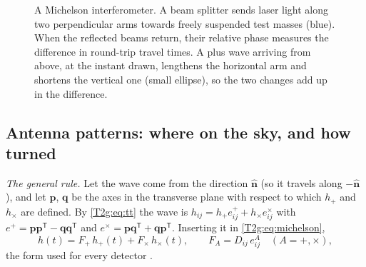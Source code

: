 \begin{figure}[htbp]
\centering
{}
\caption{A Michelson interferometer. A beam splitter sends laser light along two perpendicular arms towards freely suspended test masses (blue). When the reflected beams return, their relative phase measures the difference in round-trip travel times. A plus wave arriving from above, at the instant drawn, lengthens the horizontal arm and shortens the vertical one (small ellipse), so the two changes add up in the difference.}
\label{T2g:fig:michelson}
\end{figure}

\subsection{Antenna patterns: where on the sky, and how turned}

\emph{The general rule.} Let the wave come from the direction $\hat{\bm n}$ (so it travels along $-\hat{\bm n}$), and let $\bm p$, $\bm q$ be the axes in the transverse plane with respect to which $h_+$ and $h_\times$ are defined. By \eqref{T2g:eq:tt} the wave is $h_{ij}=h_+e^+_{ij}+h_\times e^\times_{ij}$ with $e^+=\bm p\bm p^{\mathsf T}-\bm q\bm q^{\mathsf T}$ and $e^\times=\bm p\bm q^{\mathsf T}+\bm q\bm p^{\mathsf T}$. Inserting it in \eqref{T2g:eq:michelson},
\begin{equation}
  h(t)=F_+\,h_+(t)+F_\times\,h_\times(t),\qquad F_A=D_{ij}\,e^A_{ij}\quad(A=+,\times),
  \label{T2g:eq:response}
\end{equation}
the form used for every detector \cite[eq.~(24)]{LIGOGuide2020}.

